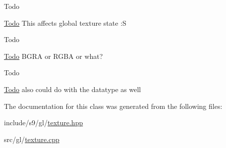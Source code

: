 \begin{DoxyRefDesc}{\-Todo}
\item[\hyperlink{todo__todo000002}{\-Todo}]\-This affects global texture state \-:\-S \end{DoxyRefDesc}


\begin{DoxyRefDesc}{\-Todo}
\item[\hyperlink{todo__todo000003}{\-Todo}]\-B\-G\-R\-A or \-R\-G\-B\-A or what? \end{DoxyRefDesc}
\begin{DoxyRefDesc}{\-Todo}
\item[\hyperlink{todo__todo000004}{\-Todo}]also could do with the datatype as well \end{DoxyRefDesc}


\-The documentation for this class was generated from the following files\-:\begin{DoxyCompactItemize}
\item 
include/s9/gl/\hyperlink{texture_8hpp}{texture.\-hpp}\item 
src/gl/\hyperlink{texture_8cpp}{texture.\-cpp}\end{DoxyCompactItemize}
